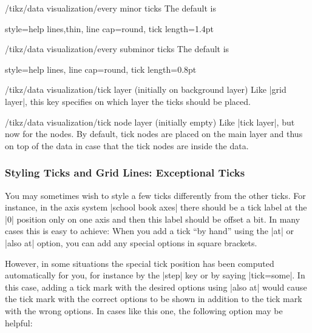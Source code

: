 \begin{stylekey}{/tikz/data visualization/every minor ticks}
  The default is
\begin{codeexample}
  style={help lines,thin, line cap=round}, tick length=1.4pt
\end{codeexample}
\end{stylekey}

\begin{stylekey}{/tikz/data visualization/every subminor ticks}
  The default is
\begin{codeexample}
  style={help lines, line cap=round}, tick length=0.8pt
\end{codeexample}
\end{stylekey}


\begin{stylekey}{/tikz/data visualization/tick layer (initially on background layer)}
  Like |grid layer|, this key specifies on which layer the ticks
  should be placed.
\end{stylekey}

\begin{stylekey}{/tikz/data visualization/tick node layer (initially
    \normalfont empty)}
  Like |tick layer|, but now for the nodes. By default, tick nodes are
  placed on the main layer and thus on top of the data in case that
  the tick nodes are inside the data.
\end{stylekey}


\subsubsection{Styling Ticks and Grid Lines: Exceptional Ticks}

You may sometimes wish to style a few ticks differently from the other
ticks. For instance, in the axis system |school book axes| there
should be a tick label at the |0| position only on one axis and then
this label should be offset a bit. In many cases this is easy to
achieve: When you add a tick ``by hand'' using the |at| or |also at|
option, you can add any special options in square brackets.

However, in some situations the special tick position has been
computed automatically for you, for instance by the |step| key or by
saying |tick=some|. In this case, adding a tick mark with the desired
options using |also at| would cause the tick mark with the correct
options to be shown in addition to the tick mark with the wrong
options. In cases like this one, the following option may be helpful:

